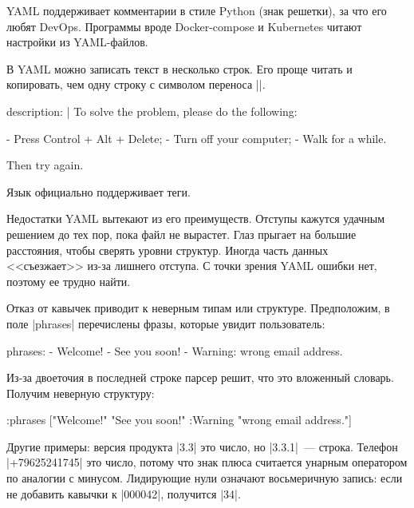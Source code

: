 YAML поддерживает комментарии в стиле Python (знак решетки), за что его любят
DevOps. Программы вроде Docker-compose и Kubernetes читают настройки из
YAML-файлов.

В YAML можно записать текст в несколько строк. Его проще читать и копировать,
чем одну строку с символом переноса \spverb|\n|.

\begin{english}
  \begin{yaml}
description: |
  To solve the problem, please do the following:

  - Press Control + Alt + Delete;
  - Turn off your computer;
  - Walk for a while.

  Then try again.
  \end{yaml}
\end{english}

Язык официально поддерживает теги.

Недостатки YAML вытекают из его преимуществ. Отступы кажутся удачным решением до
тех пор, пока файл не вырастет. Глаз прыгает на большие расстояния, чтобы
сверять уровни структур. Иногда часть данных <<съезжает>> из-за лишнего
отступа. С точки зрения YAML ошибки нет, поэтому ее трудно найти.

Отказ от кавычек приводит к неверным типам или структуре. Предположим, в
поле \spverb|phrases| перечислены фразы, которые увидит пользователь:

\begin{english}
  \begin{yaml}
phrases:
  - Welcome!
  - See you soon!
  - Warning: wrong email address.
  \end{yaml}
\end{english}

Из-за двоеточия в последней строке парсер решит, что это вложенный
словарь. Получим неверную структуру:

\begin{english}
  \begin{clojure}
{:phrases
 ["Welcome!"
  "See you soon!"
  {:Warning "wrong email address."}]}
  \end{clojure}
\end{english}

Другие примеры: версия продукта \spverb|3.3| это число, но \spverb|3.3.1|~---
строка. Телефон \spverb|+79625241745| это число, потому что знак плюса считается
унарным оператором по аналогии с минусом. Лидирующие нули означают восьмеричную
запись: если не добавить кавычки к \spverb|000042|, получится \spverb|34|.


